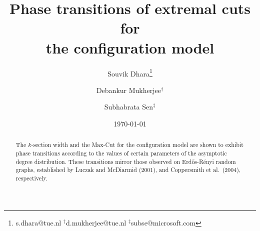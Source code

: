 \documentclass[11pt,a4paper, reqno]{article}
\numberwithin{equation}{section}
\numberwithin{equation}{section}
\newcommand{\1}{\ensuremath{\mathbbm{1}}}
\numberwithin{equation}{section}
\numberwithin{theorem}{section}
\begin{document}
\title{Phase transitions of extremal cuts for \\
the configuration model}
\author[$1$]{Souvik Dhara\footnote{s.dhara@tue.nl \hspace{3cm}$^\dagger$d.mukherjee@tue.nl \hspace{2.5cm}$^\ddagger$subse@microsoft.com}}
\author[$1$]{Debankur Mukherjee$^\dagger$}
\author[$2$]{Subhabrata Sen$^\ddagger$}

\renewcommand\Authands{, }


\date{\today}

\maketitle 

\begin{abstract} 
The $k$-section width and the Max-Cut for the configuration model are shown to exhibit phase transitions according to the values of certain parameters of the asymptotic degree distribution. These transitions mirror those observed on Erd\H{o}s-R\'enyi random graphs, established by Luczak and McDiarmid (2001), and Coppersmith et al.~(2004), respectively. 

\end{abstract}
\end{document}
